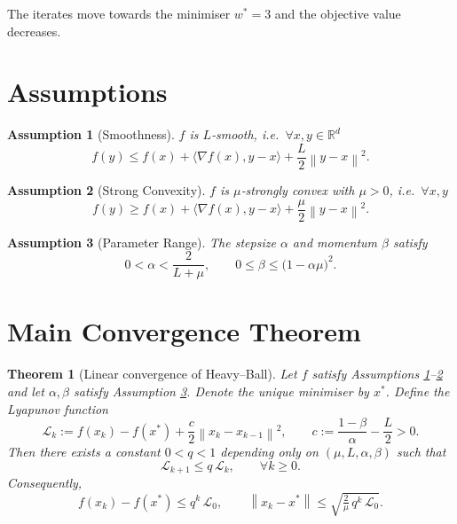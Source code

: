 \documentclass{article}
\newtheorem{theorem}{Theorem}
\newtheorem{assumption}{Assumption}
\newcommand{\norm}[1]{\left\lVert #1 \right\rVert}
\newcommand{\ip}[2]{\langle #1,#2\rangle}
\newcommand{\grad}{\nabla}
\begin{document}
The iterates move towards the minimiser $w^{*}=3$ and the objective value decreases.

\newpage
\section*{Assumptions}
\begin{assumption}[Smoothness]\label{ass:smooth}
$f$ is $L$‑smooth, i.e.\ $\forall x,y\in\mathbb{R}^{d}$
\[
f(y)\le f(x)+\ip{\grad f(x)}{y-x}+\frac{L}{2}\norm{y-x}^{2}.
\]
\end{assumption}
\begin{assumption}[Strong Convexity]\label{ass:strong}
$f$ is $\mu$‑strongly convex with $\mu>0$, i.e.\ $\forall x,y$
\[
f(y)\ge f(x)+\ip{\grad f(x)}{y-x}+\frac{\mu}{2}\norm{y-x}^{2}.
\]
\end{assumption}
\begin{assumption}[Parameter Range]\label{ass:param}
The stepsize $\alpha$ and momentum $\beta$ satisfy
\[
0<\alpha<\frac{2}{L+\mu},\qquad
0\le\beta\le\bigl(1-\alpha\mu\bigr)^{2}.
\]
\end{assumption}

\section*{Main Convergence Theorem}
\begin{theorem}[Linear convergence of Heavy–Ball]\label{thm:linear}
Let $f$ satisfy Assumptions \ref{ass:smooth}–\ref{ass:strong} and let $\alpha,\beta$ satisfy Assumption \ref{ass:param}.  
Denote the unique minimiser by $x^{*}$.  
Define the Lyapunov function
\[
\mathcal{L}_{k}:= f(x_{k})-f(x^{*})+\frac{c}{2}\norm{x_{k}-x_{k-1}}^{2},
\qquad 
c:=\frac{1-\beta}{\alpha}-\frac{L}{2}>0.
\]
Then there exists a constant $0<q<1$ depending only on $(\mu,L,\alpha,\beta)$ such that
\[
\mathcal{L}_{k+1}\le q\,\mathcal{L}_{k},\qquad\forall k\ge0.
\]
Consequently,
\[
f(x_{k})-f(x^{*})\le q^{k}\,\mathcal{L}_{0},\qquad
\norm{x_{k}-x^{*}}\le \sqrt{\tfrac{2}{\mu}\,q^{k}\,\mathcal{L}_{0}}.
\]
\end{theorem}
\end{document}
